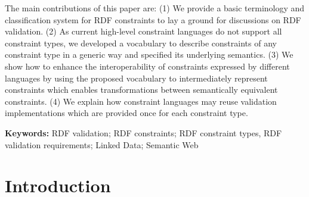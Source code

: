 \documentclass[a4paper,fontsize=11pt]{scrartcl}
\begin{document}
The main contributions of this paper are:
(1) We provide a basic terminology and classification system for RDF constraints to lay a ground for discussions on RDF validation.
(2) As current high-level constraint languages do not support all constraint types, 
we developed a vocabulary to describe constraints of any constraint type in a generic way and specified its underlying semantics.
(3) We show how to enhance the interoperability of constraints expressed by different languages by using the proposed vocabulary 
to intermediately represent constraints 
which enables transformations between semantically equivalent constraints.
(4) We explain how constraint languages may reuse validation implementations which are provided once for each constraint type.

\hspace{-1.4em}
\textbf{Keywords:}
RDF validation; RDF constraints; RDF constraint types, RDF validation requirements; Linked Data; Semantic Web

\section{Introduction}
\end{document}
